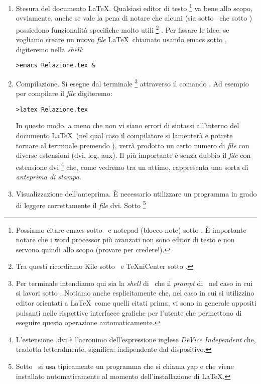 \begin{enumerate}
\item{
Stesura del documento \LaTeX. Qualsiasi editor di testo%
\footnote{
Possiamo citare emacs sotto \linux\ e notepad (blocco note) sotto \windows.
\`E importante notare che i word processor pi\`u avanzati non sono editor di
testo e non servono quindi allo scopo (provare per credere!).
}
va bene allo scopo, ovviamente, anche se vale la pena di notare che alcuni
(sia sotto \linux\ che sotto \windows) possiedono funzionalit\`a specifiche
molto utili%
\footnote{
Tra questi ricordiamo Kile sotto \linux\ e TeXniCenter sotto \windows.
}%
.
Per fissare le idee, se vogliamo creare un nuovo \emph{file} \LaTeX\ chiamato
 usando emacs sotto \linux, digiteremo nella \emph{shell}:
\begin{verbatim}
>emacs Relazione.tex &
\end{verbatim}
}
\item{
Compilazione. Si esegue dal terminale%
\footnote{
Per terminale intendiamo qui sia la \emph{shell} di \linux\ che il
\emph{prompt} di \dos\ nel caso in cui si lavori sotto \windows. Notiamo anche
esplicitamente che, nel caso in cui si utilizzino editor orientati a \LaTeX\
come quelli citati prima, vi sono in generale appositi pulsanti nelle
rispettive interfacce grafiche per l'utente che permettono di eseguire questa
operazione automaticamente.
}
attraverso il comando . Ad esempio per compilare il \emph{file}
\cchar{Relazione.tex} digiteremo:
\begin{verbatim}
>latex Relazione.tex
\end{verbatim}
In questo modo, a meno che non vi siano errori di sintassi all'interno del
documento \LaTeX\ (nel qual caso il compilatore si lamenter\`a e potrete
tornare al terminale premendo \ckey{CTRL + C}), verr\`a prodotto un certo
numero di \emph{file} con diverse estensioni (dvi, log, aux).
Il pi\`u importante \`e senza dubbio il \emph{file} con estensione dvi%
\footnote{
L'estensione .dvi \`e l'acronimo dell'espressione inglese \emph{DeVice
Independent} che, tradotta letteralmente, significa: indipendente dal
dispositivo.
}
che, come vedremo tra un attimo, rappresenta una sorta di \emph{anteprima di
stampa}.
}
\item{
Visualizzazione dell'anteprima. \`E necessario utilizzare un programma in
grado di leggere correttamente il \emph{file} dvi. Sotto \linux%
\footnote{
Sotto \windows\ si usa tipicamente un programma che si chiama yap e che viene
installato automaticamente al momento dell'installazione di \LaTeX.
}}
\end{enumerate}
